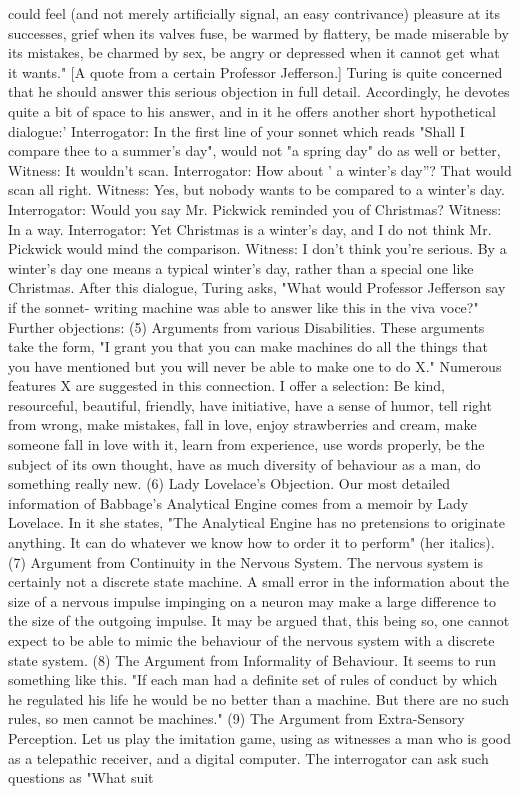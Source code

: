 {     could feel (and not merely artificially signal, an easy contrivance) pleasure at its
     successes, grief when its valves fuse, be warmed by flattery, be made miserable
     by its mistakes, be charmed by sex, be angry or depressed when it cannot get
     what it wants." [A quote from a certain Professor Jefferson.]
Turing is quite concerned that he should answer this serious objection in full detail.
Accordingly, he devotes quite a bit of space to his answer, and in it he offers another
short hypothetical dialogue:'
   Interrogator: In the first line of your sonnet which reads "Shall I compare thee to a
     summer's day", would not "a spring day" do as well or better, Witness: It
     wouldn't scan.
   Interrogator: How about ' a winter's day''? That would scan all right. Witness: Yes,
     but nobody wants to be compared to a winter's day. Interrogator: Would you say
     Mr. Pickwick reminded you of Christmas? Witness: In a way.
   Interrogator: Yet Christmas is a winter's day, and I do not think Mr. Pickwick
     would mind the comparison.
   Witness: I don't think you're serious. By a winter's day one means a typical winter's
     day, rather than a special one like Christmas.
After this dialogue, Turing asks, "What would Professor Jefferson say if the sonnet-
writing machine was able to answer like this in the viva voce?"
        Further objections:
   (5) Arguments from various Disabilities. These arguments take the form, "I grant you that
      you can make machines do all the things that you have mentioned but you will never be
      able to make one to do X." Numerous features X are suggested in this connection. I offer
      a selection:
   Be kind, resourceful, beautiful, friendly, have initiative, have a sense of humor, tell right
      from wrong, make mistakes, fall in love, enjoy strawberries and cream, make someone
      fall in love with it, learn from experience, use words properly, be the subject of its own
      thought, have as much diversity of behaviour as a man, do something really new.
   (6) Lady Lovelace's Objection. Our most detailed information of Babbage's Analytical
      Engine comes from a memoir by Lady Lovelace. In it she states, "The Analytical Engine
      has no pretensions to originate anything. It can do whatever we know how to order it to
      perform" (her italics).
   (7) Argument from Continuity in the Nervous System. The nervous system is certainly not
      a discrete state machine. A small error in the information about the size of a nervous
      impulse impinging on a neuron may make a large difference to the size of the outgoing
      impulse. It may be argued that, this being so, one cannot expect to be able to mimic the
      behaviour of the nervous system with a discrete state system.
   (8) The Argument from Informality of Behaviour. It seems to run something like this. "If
      each man had a definite set of rules of conduct by which he regulated his life he would
      be no better than a machine. But there are no such rules, so men cannot be machines."
   (9) The Argument from Extra-Sensory Perception. Let us play the imitation game, using as
      witnesses a man who is good as a telepathic receiver, and a digital computer. The
      interrogator can ask such questions as "What suit




}
